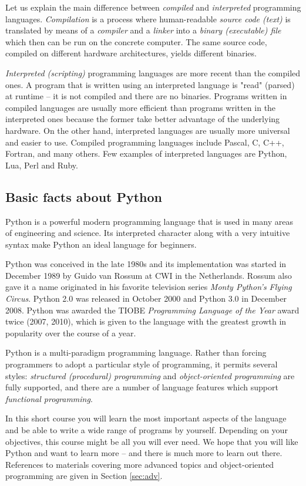 \documentclass[article,A4,12pt]{llncs}
\begin{document}
Let us explain the main difference between {\em compiled} and {\em interpreted} programming languages. 
{\em Compilation} is a process where human-readable {\em source code (text)} is translated by
means of a {\em compiler} and a {\em linker}
into a {\em binary (executable) file} which then can be run on the concrete computer. The same 
source code, compiled on different hardware architectures, yields different binaries. 

{\em Interpreted (scripting)} programming languages are more recent than the compiled ones. 
A program that is written using an interpreted language is "read" (parsed) at runtime -- it is 
not compiled and there are no binaries. Programs 
written in compiled languages are usually more efficient than programs written in the interpreted 
ones because the former take better advantage of the underlying hardware. On the other hand,
interpreted languages are usually more universal and easier to use. Compiled 
programming languages include Pascal, C, C++, Fortran, and many others. Few examples of interpreted 
languages are Python, Lua, Perl and Ruby. 

\subsection{Basic facts about Python}

Python is a powerful modern programming language that is used in many areas of 
engineering and science. Its interpreted character along with a very intuitive syntax make Python an 
ideal language for beginners. 

Python was conceived in the late 1980s and its implementation was started in December 1989
by Guido van Rossum at CWI in the Netherlands. Rossum also gave it a name originated
in his favorite television series {\em Monty Python's Flying Circus}.
Python 2.0 was released in October 2000 and Python 3.0 in December 2008. Python was
awarded the TIOBE {\em Programming Language of the Year} award twice (2007, 2010), which is 
given to the language with the greatest growth in popularity over the course of a year.

Python is a multi-paradigm programming language. Rather than forcing programmers to 
adopt a particular style of programming, it permits several styles: {\em structured (procedural) 
programming} and {\em object-oriented programming} are fully supported, and there are a number 
of language features which support {\em functional programming}. 

In this short course you will 
learn the most important aspects of the language and be able to 
write a wide range of programs by yourself. Depending on your objectives, this course 
might be all you will ever need. We hope that you will like Python and want
to learn more -- and there is much more to learn out there. References to materials
covering more advanced topics and object-oriented programming are given in Section \ref{sec:adv}.
\end{document}
